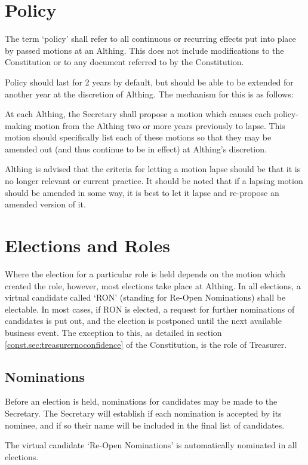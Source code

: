 \documentclass[a4paper, 12pt]{article} %
\begin{document}
\section{Policy}
The term `policy' shall refer to all continuous or recurring effects put into place by passed motions at an Althing. This does not include modifications to the Constitution or to any document referred to by the Constitution.

Policy should last for 2 years by default, but should be able to be extended for another year at the discretion of Althing. The mechanism for this is as follows:

At each Althing, the Secretary shall propose a motion which causes each policy-making motion from the Althing two or more years previously to lapse. This motion should specifically list each of these motions so that they may be amended out (and thus continue to be in effect) at Althing's discretion.

Althing is advised that the criteria for letting a motion lapse should be that it is no longer relevant or current practice.  It should be noted that if a lapsing motion should be amended in some way, it is best to let it lapse and re-propose an amended version of it.

\section{Elections and Roles}
Where the election for a particular role is held depends on the motion which created the role, however, most elections take place at Althing.  In all elections, a virtual candidate called `RON' (standing for Re-Open Nominations) shall be electable.  In most cases, if RON is elected, a request for further nominations of candidates is put out, and the election is postponed until the next available business event.  The exception to this, as detailed in section \autoref{const.sec:treasurernoconfidence} of the Constitution, is the role of Treasurer.

\subsection{Nominations}
Before an election is held, nominations for candidates may be made to the Secretary.  The Secretary will establish if each nomination is accepted by its nominee, and if so their name will be included in the final list of candidates.

The virtual candidate `Re-Open Nominations' is automatically nominated in all elections.
\end{document}
